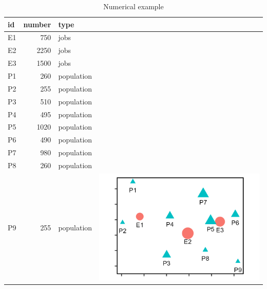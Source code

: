 \documentclass[]{elsarticle} %
\begin{document}
\begin{table}

\caption{\label{tab:toy-example-table}\label{tab:toy-example}Numerical example}
\centering
\begin{tabular}[t]{lrl>{}l}
\toprule
id & number & type & \\
\midrule
E1 & 750 & jobs & \\

E2 & 2250 & jobs & \\

E3 & 1500 & jobs & \\

P1 & 260 & population & \\

P2 & 255 & population & \\

P3 & 510 & population & \\

P4 & 495 & population & \\

P5 & 1020 & population & \\

P6 & 490 & population & \\

P7 & 980 & population & \\

P8 & 260 & population & \\

P9 & 255 & population & \multirow{-12}{*}{\raggedright\arraybackslash \includegraphics{images/figure-1.png}}\\
\bottomrule
\end{tabular}
\end{table}
\end{document}

